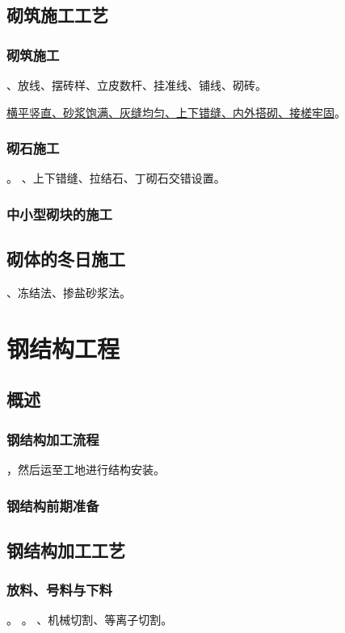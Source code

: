 \documentclass{book}
\begin{document}
\section{砌筑施工工艺}
\subsection{砌筑施工}
、放线、摆砖样、立皮数杆、挂准线、铺线、砌砖。
\par\underline{横平竖直、砂浆饱满、灰缝均匀、上下错缝、内外搭砌、接槎牢固}。
\subsection{砌石施工}
。
、上下错缝、拉结石、丁砌石交错设置。
\subsection{中小型砌块的施工}
\section{砌体的冬日施工}
、冻结法、掺盐砂浆法。
\chapter{钢结构工程}
\section{概述}
\subsection{钢结构加工流程}
，然后运至工地进行结构安装。
\subsection{钢结构前期准备}
\section{钢结构加工工艺}
\subsection{放料、号料与下料}
。
。
、机械切割、等离子切割。
\end{document}
